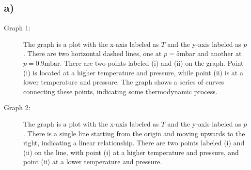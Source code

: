 

\subsection*{a)}

\begin{description}
    \item[Graph 1:] The graph is a plot with the x-axis labeled as $T$ and the y-axis labeled as $p$. There are two horizontal dashed lines, one at $p = 5 \text{mbar}$ and another at $p = 0.9 \text{mbar}$. There are two points labeled (i) and (ii) on the graph. Point (i) is located at a higher temperature and pressure, while point (ii) is at a lower temperature and pressure. The graph shows a series of curves connecting these points, indicating some thermodynamic process.
    \item[Graph 2:] The graph is a plot with the x-axis labeled as $T$ and the y-axis labeled as $p$. There is a single line starting from the origin and moving upwards to the right, indicating a linear relationship. There are two points labeled (i) and (ii) on the line, with point (i) at a higher temperature and pressure, and point (ii) at a lower temperature and pressure.
\end{description}